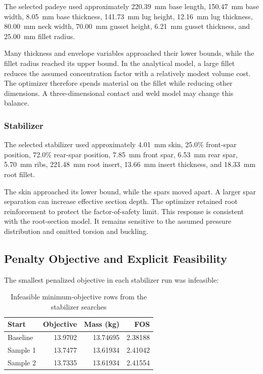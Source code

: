 The selected padeye used approximately 220.39~mm base length,
150.47~mm base width, 8.05~mm base thickness, 141.73~mm lug height,
12.16~mm lug thickness, 80.00~mm neck width, 70.00~mm gusset height,
6.21~mm gusset thickness, and 25.00~mm fillet radius.

Many thickness and envelope variables approached their lower bounds, while
the fillet radius reached its upper bound. In the analytical model, a large
fillet reduces the assumed concentration factor with a relatively modest
volume cost. The optimizer therefore spends material on the fillet while
reducing other dimensions. A three-dimensional contact and weld model may
change this balance.

\subsubsection{Stabilizer}

The selected stabilizer used approximately 4.01~mm skin, 25.0\% front-spar
position, 72.0\% rear-spar position, 7.85~mm front spar, 6.53~mm rear spar,
5.70~mm ribs, 221.48~mm root insert, 13.66~mm insert thickness, and
18.33~mm root fillet.

The skin approached its lower bound, while the spars moved apart. A larger spar
separation can increase effective section depth. The optimizer retained root
reinforcement to protect the factor-of-safety limit. This response is
consistent with the root-section model. It remains sensitive to the assumed
pressure distribution and omitted torsion and buckling.

\subsection{Penalty Objective and Explicit Feasibility}
\label{sec:penalty-results}

The smallest penalized objective in each stabilizer run was infeasible:

\begin{table}[H]
\centering
\caption{Infeasible minimum-objective rows from the stabilizer searches}
\label{tab:stabilizer-infeasible-objective}
\begin{tabularx}{\textwidth}{Xrrr}
\toprule
\textbf{Start} & \textbf{Objective} & \textbf{Mass (kg)} & \textbf{FOS}\\
\midrule
Baseline & 13.9702 & 13.74695 & 2.38188\\
Sample 1 & 13.7477 & 13.61934 & 2.41042\\
Sample 2 & 13.7335 & 13.61934 & 2.41554\\
\bottomrule
\end{tabularx}
\end{table}

